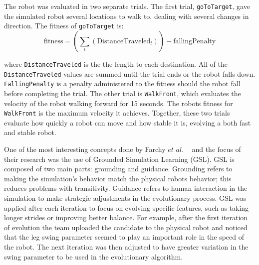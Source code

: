 \documentclass{sig-alternate}
\begin{document}
 The robot was evaluated in two separate trials. The first trial, {\tt goToTarget}, gave the simulated robot several locations to walk to, dealing with several changes in direction. The fitness of {\tt goToTarget} is:
\[
  \textrm{fitness} = (\sum_{t} (\textrm{DistanceTraveled}_t)) - \textrm{fallingPenalty}
\] 

 where {\tt DistanceTraveled} is the the length to each destination. All of the {\tt DistanceTraveled} values are summed until the trial ends or the robot falls down. {\tt FallingPenalty} is a penalty administered to the fitness should the robot fall before completing the trial. The other trial is {\tt WalkFront}, which evaluates the velocity of the robot walking forward for 15 seconds. The robots fitness for {\tt WalkFront} is the maximum velocity it achieves. Together, these two trials evaluate how quickly a robot can move and how stable it is, evolving a both fast and stable robot.
  
  
  One of the most interesting concepts done by Farchy $et$ $al.$ ~\cite{Farchy:2013:HRL:2484920.2484930} and the focus of their research was the use of Grounded Simulation Learning (GSL). GSL is composed of two main parts: grounding and guidance. Grounding refers to making the simulation's behavior match the physical robots behavior; this reduces problems with transitivity. Guidance refers to human interaction in the simulation to make strategic adjustments in the evolutionary process. GSL was applied after each iteration to focus on evolving specific features, such as taking longer strides or improving better balance. For example, after the first iteration of evolution the team uploaded the candidate to the physical robot and noticed that the leg swing parameter seemed to play an important role in the speed of the robot. The next iteration was then adjusted to have greater variation in the swing parameter to be used in the evolutionary algorithm. 
\end{document}
